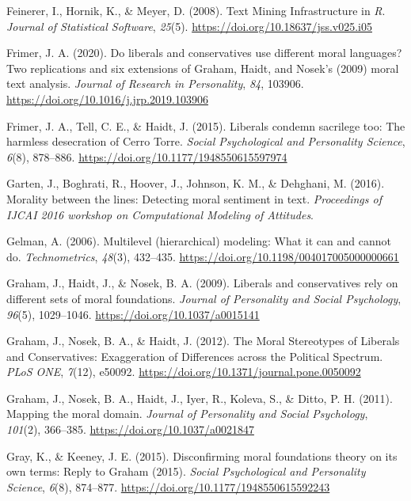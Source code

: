 \documentclass[
  man,floatsintext]{apa6}
\newlength{\cslhangindent}
\newenvironment{CSLReferences}[2] %
 {\begin{list}{}{%
  \setlength{\itemindent}{0pt}
  \setlength{\leftmargin}{0pt}
  \setlength{\parsep}{0pt}
  \ifodd #1
   \setlength{\leftmargin}{\cslhangindent}
   \setlength{\itemindent}{-1\cslhangindent}
  \fi
  \setlength{\itemsep}{#2\baselineskip}}}
 {\end{list}}
\begin{document}
\begin{CSLReferences}{1}{0}
Feinerer, I., Hornik, K., \& Meyer, D. (2008). Text Mining Infrastructure in {\emph{R}}. \emph{Journal of Statistical Software}, \emph{25}(5). \url{https://doi.org/10.18637/jss.v025.i05}

Frimer, J. A. (2020). Do liberals and conservatives use different moral languages? Two replications and six extensions of {G}raham, {H}aidt, and {N}osek's (2009) moral text analysis. \emph{Journal of Research in Personality}, \emph{84}, 103906. \url{https://doi.org/10.1016/j.jrp.2019.103906}

Frimer, J. A., Tell, C. E., \& Haidt, J. (2015). Liberals condemn sacrilege too: The harmless desecration of {C}erro {T}orre. \emph{Social Psychological and Personality Science}, \emph{6}(8), 878--886. \url{https://doi.org/10.1177/1948550615597974}

Garten, J., Boghrati, R., Hoover, J., Johnson, K. M., \& Dehghani, M. (2016). Morality between the lines: Detecting moral sentiment in text. \emph{{Proceedings of IJCAI 2016 workshop on Computational Modeling of Attitudes}}.

Gelman, A. (2006). {Multilevel (hierarchical) modeling: What it can and cannot do}. \emph{Technometrics}, \emph{48}(3), 432--435. \url{https://doi.org/10.1198/004017005000000661}

Graham, J., Haidt, J., \& Nosek, B. A. (2009). {Liberals and conservatives rely on different sets of moral foundations.} \emph{Journal of Personality and Social Psychology}, \emph{96}(5), 1029--1046. \url{https://doi.org/10.1037/a0015141}

Graham, J., Nosek, B. A., \& Haidt, J. (2012). {The Moral Stereotypes of Liberals and Conservatives: Exaggeration of Differences across the Political Spectrum}. \emph{PLoS ONE}, \emph{7}(12), e50092. \url{https://doi.org/10.1371/journal.pone.0050092}

Graham, J., Nosek, B. A., Haidt, J., Iyer, R., Koleva, S., \& Ditto, P. H. (2011). {Mapping the moral domain.} \emph{Journal of Personality and Social Psychology}, \emph{101}(2), 366--385. \url{https://doi.org/10.1037/a0021847}

Gray, K., \& Keeney, J. E. (2015). Disconfirming moral foundations theory on its own terms: Reply to {G}raham (2015). \emph{Social Psychological and Personality Science}, \emph{6}(8), 874--877. \url{https://doi.org/10.1177/1948550615592243}


\end{CSLReferences}
\end{document}
